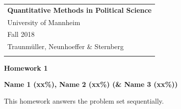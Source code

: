 \documentclass[a4paper,12pt]{article} %
\begin{document}



\thispagestyle{empty} %

\begin{tabular}{p{15.5cm}} %
{\large \bf Quantitative Methods in Political Science} \\
University of Mannheim \\ Fall 2018  \\ Traunm\"uller, Neunhoeffer \& Sternberg\\
\hline %
\\
\end{tabular} %

\vspace*{0.3cm} %

\begin{center} %
	{\Large \bf Homework 1} %
	\vspace{2mm}
	
	{\bf Name 1 (xx\%), Name 2 (xx\%) (\& Name 3 (xx\%))} %
		
\end{center}  

\vspace{0.4cm}



This homework answers the problem set sequentially. 
\end{document}
